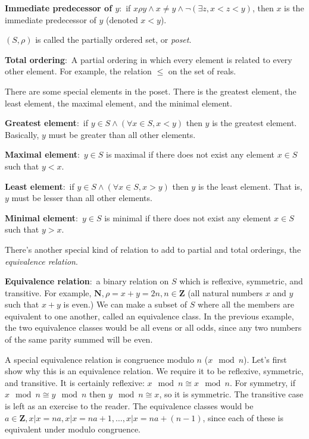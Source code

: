 \documentclass[nobib]{tufte-handout}
\newcommand{\defn}[2]{\noindent\textbf{#1}:\ #2}
\begin{document}
\defn{Immediate predecessor of $y$}{if $x\rho y \land x \neq y \land \neg (\exists z, x < z< y)$, then $x$ is the 
immediate predecessor of $y$ (denoted $x<y$)}. 

$(S, \rho)$ is called the partially ordered set, or \emph{poset}. 

\defn{Total ordering}{A partial ordering in which every element is related to 
every other element}. For example, the relation $\leq$ on the set of reals. 

There are some special elements in the poset. There is the greatest element, 
the least element, the maximal element, and the minimal element. 

\defn{Greatest element}{if $y \in S \land (\forall x \in S, x<y)$
then $y$ is the greatest element}. Basically, $y$ must be greater 
than all other elements. 

\defn{Maximal element}{$y\in S$ is maximal if there does not exist any 
element $x \in S$ such that $y < x$.}

\defn{Least element}{if $y \in S \land (\forall x \in S, x>y)$
then $y$ is the least element}. That is, $y$ must be lesser 
than all other elements. 

\defn{Minimal element}{$y\in S$ is minimal if there does not exist any 
element $x \in S$ such that $y > x$.}

There's another special kind of relation to add to partial and total 
orderings, the \emph{equivalence relation}. 

\defn{Equivalence relation}{a binary relation on $S$ which is 
reflexive, symmetric, and transitive}. For example, $\mathbf{N}, \rho = x + y = 2n, n \in \mathbf{Z}$
(all natural numbers $x$ and $y$ such that $x+y$ is even.)
We can make a subset of $S$ where all the members are equivalent to one another, 
called an equivalence class. In the previous example, the two equivalence 
classes would be all evens or all odds, since any two numbers of the same 
parity summed will be even. 

A special equivalence relation is congruence modulo $n$ ($x \mod n$). 
Let's first show why this is an equivalence relation. We require it to be 
reflexive, symmetric, and transitive. It is certainly reflexive: $x \mod n \cong x \mod n$. 
For symmetry, if $x \mod n \cong y \mod n$ then $y \mod n \cong x$, so it is symmetric. 
The transitive case is left as an exercise to the reader. The equivalence classes would be 
$a \in \mathbf{Z}, {x | x = na}, {x | x = na + 1}, \dots, {x | x = na + (n-1)}$, since each 
of these is equivalent under modulo congruence. 
\end{document}
